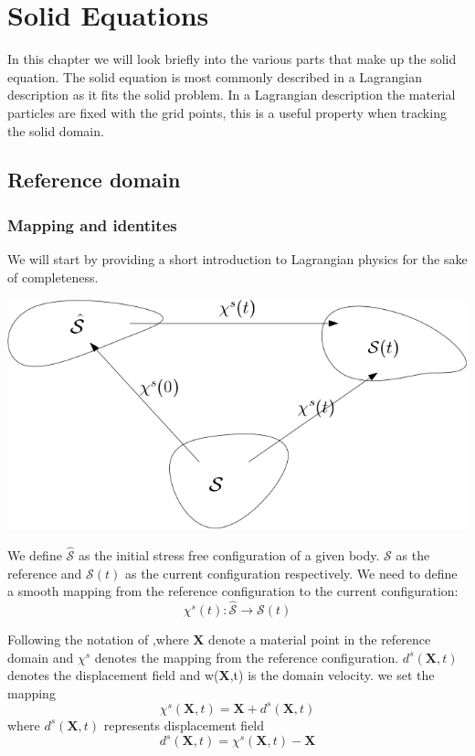 \chapter*{Solid Equations}
In this chapter we will look briefly into the various parts that make up the solid equation. The solid equation is most commonly described in a Lagrangian description as it fits the solid problem. In a Lagrangian description the material particles are fixed with the grid points, this is a useful property when tracking the solid domain.

\section*{Reference domain}
\subsection*{Mapping and identites}
We will start by providing a short introduction to Lagrangian physics for the sake of completeness.
\begin{center}
\includegraphics[scale=0.4]{continuum_mapping.png}
\end{center}
We define $ \hat{\mathcal{S}}$ as the initial stress free configuration of a given body. $\mathcal{S}$ as the reference and $\mathcal{S}(t)$ as the current configuration respectively.
We need to define a smooth mapping from the reference configuration to the current configuration:
$$  \chi^s(t) : \hat{\mathcal{S}} \rightarrow \mathcal{S}(t)     $$ 

Following the notation of \cite{Holzapfel2000},where $\textbf{X}$ denote a material point in the reference domain and $\chi^s$ denotes the mapping from the reference configuration. 
$d^s(\textbf{X},t)$ denotes the displacement field and w(\textbf{X},t) is the domain velocity. we set the mapping
$$\chi^s(\textbf{X},t) = \textbf{X}  + d^s(\textbf{X} ,t)$$
where $d^s(\textbf{X} ,t)$ represents displacement field
$$  d^s(\textbf{X},t) = \chi^s(\textbf{X},t) -\textbf{X}   $$

